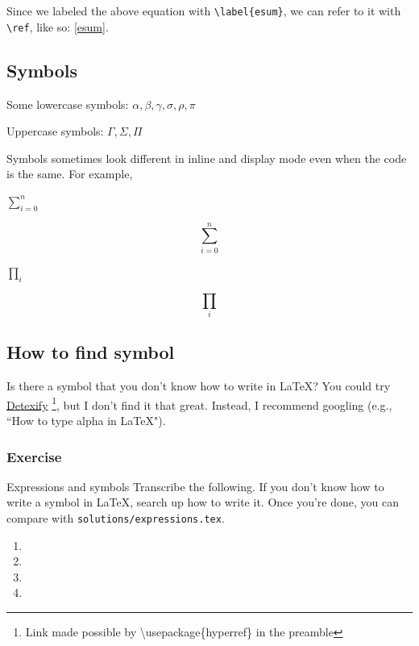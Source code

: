 \documentclass{article}
\begin{document}
Since we labeled the above equation with \texttt{\textbackslash label\{esum\}}, we can refer to it with \texttt{\textbackslash ref}, like so: \ref{esum}.


\subsection{Symbols}

Some lowercase symbols: $\alpha, \beta, \gamma, \sigma, \rho, \pi$

Uppercase symbols: $\Gamma, \Sigma, \Pi$

Symbols sometimes look different in inline and display mode even when the code is the same. For example,

$\sum_{i=0}^n$

$$\sum_{i=0}^n$$

$\prod_i$

$$\prod_i$$

\subsection{How to find symbol}

Is there a symbol that you don't know how to write in \LaTeX? You could try \href{https://detexify.kirelabs.org/classify.html}{Detexify} \footnote{Link made possible by \textbackslash usepackage\{hyperref\} in the preamble}, but I don't find it that great. Instead, I recommend googling (e.g., ``How to type alpha in LaTeX").

\subsubsection{Exercise}

\begin{exercise}{Expressions and symbols}{}
    Transcribe the following. If you don't know how to write a symbol in \LaTeX, search up how to write it. Once you're done, you can compare with \texttt{solutions/expressions.tex}.

    
\end{exercise}

\begin{solution}{}{}
    \begin{enumerate}
        \item 
        \item 
        \item 
        \item 
    \end{enumerate}
\end{solution}
\end{document}
